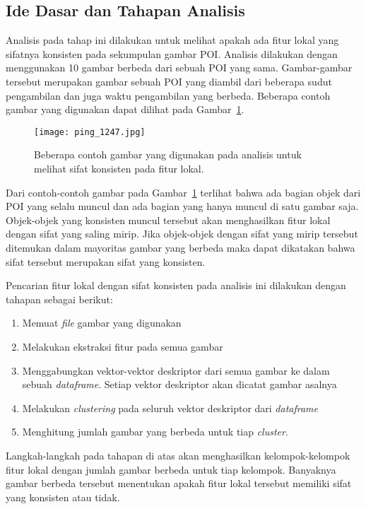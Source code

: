 \subsection{Ide Dasar dan Tahapan Analisis}
Analisis pada tahap ini dilakukan untuk melihat apakah ada fitur lokal yang sifatnya konsisten pada sekumpulan gambar POI. Analisis dilakukan dengan menggunakan 10 gambar berbeda dari sebuah POI yang sama. Gambar-gambar tersebut merupakan gambar sebuah POI yang diambil dari beberapa sudut pengambilan dan juga waktu pengambilan yang berbeda. Beberapa contoh gambar yang digunakan dapat dilihat pada Gambar~\ref{fig:contoh_ping}.
\begin{figure}[H]
	\centering
	\texttt{[image: ping\_1247.jpg]}	
	\caption{Beberapa contoh gambar yang digunakan pada analisis untuk melihat sifat konsisten pada fitur lokal.}
	\label{fig:contoh_ping}
\end{figure}
Dari contoh-contoh gambar pada Gambar~\ref{fig:contoh_ping} terlihat bahwa ada bagian objek dari POI yang selalu muncul dan ada bagian yang hanya muncul di satu gambar saja. Objek-objek yang konsisten muncul tersebut akan menghasilkan fitur lokal dengan sifat yang saling mirip. Jika objek-objek dengan sifat yang mirip tersebut ditemukan dalam mayoritas gambar yang berbeda maka dapat dikatakan bahwa sifat tersebut merupakan sifat yang konsisten.

Pencarian fitur lokal dengan sifat konsisten pada analisis ini dilakukan dengan tahapan sebagai berikut:
\begin{enumerate}
	\item Memuat \textit{file} gambar yang digunakan
	\item Melakukan ekstraksi fitur pada semua gambar
	\item Menggabungkan vektor-vektor deskriptor dari semua gambar ke dalam sebuah \textit{dataframe}. Setiap vektor deskriptor akan dicatat gambar asalnya
	\item Melakukan \textit{clustering} pada seluruh vektor deskriptor dari \textit{dataframe}
	\item Menghitung jumlah gambar yang berbeda untuk tiap \textit{cluster}.
\end{enumerate}
Langkah-langkah pada tahapan di atas akan menghasilkan kelompok-kelompok fitur lokal dengan jumlah gambar berbeda untuk tiap kelompok. Banyaknya gambar berbeda tersebut menentukan apakah fitur lokal tersebut memiliki sifat yang konsisten atau tidak. 

